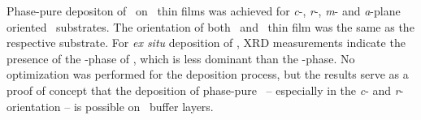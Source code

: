 Phase-pure depositon of \agao\ on \cro\ thin films was achieved for \textit{c}-, \textit{r}-, \textit{m}- and \textit{a}-plane oriented \alo\ substrates.
The orientation of both \cro\ and \agao\ thin film was the same as the respective substrate.
For \textit{ex situ} deposition of \gao, XRD measurements indicate the presence of the \textkappa-phase of \gao, which is less dominant than the \textalpha-phase.
No optimization was performed for the deposition process, but the results serve as a proof of concept that the deposition of phase-pure \agao\ -- especially in the \textit{c}- and \textit{r}-orientation -- is possible on \cro\ buffer layers.